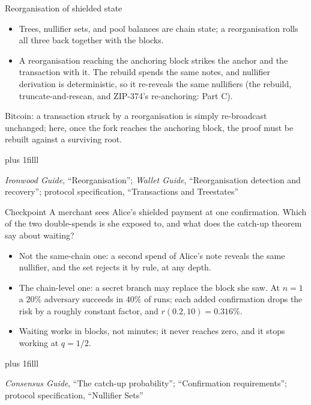 \documentclass[aspectratio=169,11pt]{beamer}
\newcommand{\src}[1]{\par\vskip0pt plus 1filll
  {\fontsize{6}{7.2}\selectfont\color{arbdim}\raggedright #1\par}}
\begin{document}
\begin{frame}{Reorganisation of shielded state}
\begin{itemize}
\item Trees, nullifier sets, and pool balances are chain state; a
  reorganisation rolls all three back together with the blocks.
\item A reorganisation reaching the anchoring block strikes the anchor
  and the transaction with it. The rebuild spends the same notes, and
  nullifier derivation is deterministic, so it re-reveals the same
  nullifiers (the rebuild, truncate-and-rescan, and ZIP-374's
  re-anchoring: Part C).
\end{itemize}
\medskip
\alert{Bitcoin:} a transaction struck by a reorganisation is simply
re-broadcast unchanged; here, once the fork reaches the anchoring
block, the proof must be rebuilt against a surviving root.
\src{\emph{Ironwood Guide}, ``Reorganisation''; \emph{Wallet Guide},
  ``Reorganisation detection and recovery''; protocol specification,
  ``Transactions and Treestates''}
\end{frame}

\begin{frame}{Checkpoint}
A merchant sees Alice's shielded payment at one confirmation. Which of
the two double-spends is she exposed to, and what does the catch-up
theorem say about waiting?
\pause
\medskip

\begin{itemize}
\item Not the same-chain one: a second spend of Alice's note reveals
  the same nullifier, and the set rejects it by rule, at any depth.
\item The chain-level one: a secret branch may replace the block she
  saw. At $n = 1$ a $20\%$ adversary succeeds in $40\%$ of runs; each
  added confirmation drops the risk by a roughly constant factor, and
  $r(0.2, 10) = 0.316\%$.
\item Waiting works in blocks, not minutes; it never reaches zero, and
  it stops working at $q = 1/2$.
\end{itemize}
\src{\emph{Consensus Guide}, ``The catch-up probability''; ``Confirmation requirements''; protocol specification, ``Nullifier Sets''}
\end{frame}

\end{document}
